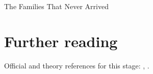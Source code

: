 \begin{ledger}{The Families That Never Arrived}
\end{ledger}

\section{Further reading}
\label{sec:never_arrived:further_reading}
Official and theory references for this stage: \cite{CMS:2019ctu}, \cite{CMS:2014nva}.

\begin{pitfalls}
\end{pitfalls}

\begin{exercises}
\item {}
\item {}
\end{exercises}

